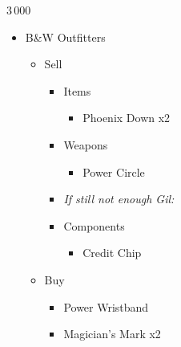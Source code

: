 	\begin{shop}{3\,000}
		\begin{itemize}
			\item B\&W Outfitters
			      \begin{itemize}
				      \item Sell
				            \begin{itemize}
					            \item Items
					                  \begin{itemize}
						                  \item Phoenix Down x2
					                  \end{itemize}
					            \item Weapons
					                  \begin{itemize}
						                  \item Power Circle
					                  \end{itemize}
					            \item \textit{If still not enough Gil:}
					            \item Components
					                  \begin{itemize}
						                  \item Credit Chip
					                  \end{itemize}
				            \end{itemize}
				      \item Buy
				            \begin{itemize}
					            \item Power Wristband
					            \item Magician's Mark x2
				            \end{itemize}
			      \end{itemize}
		\end{itemize}
	\end{shop}
	\vfill
